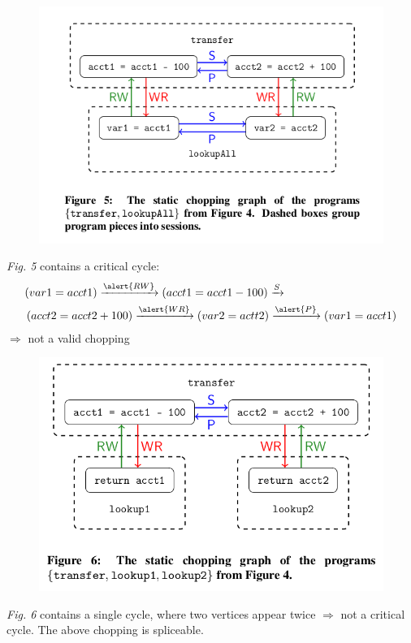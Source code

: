 \documentclass{beamer}
\begin{document}
\begin{frame}
	\begin{figure}
		\includegraphics[scale=0.28]{fig5}
	\end{figure}
	\begin{example}
		\textit{Fig. 5} contains a critical cycle:
		\begin{align*}
			&(var1=acct1) \xrightarrow{\alert{RW}} (acct1=acct1-100) \xrightarrow{S} \\
			&\left(acct2 = acct2 + 100\right) \xrightarrow{\alert{WR}}
			(var2=actt2) \xrightarrow{\alert{P}} (var1=acct1)
		\end{align*}
	$\Rightarrow$ not a valid chopping
	\end{example}
\end{frame}

\begin{frame}
	\begin{figure}
		\includegraphics[scale=0.24]{fig6}
	\end{figure}
	\begin{example}
		\textit{Fig. 6} contains a single cycle, where two vertices appear twice $\Rightarrow$ not a critical cycle. The above chopping is spliceable.
	\end{example}
\end{frame}
\end{document}
